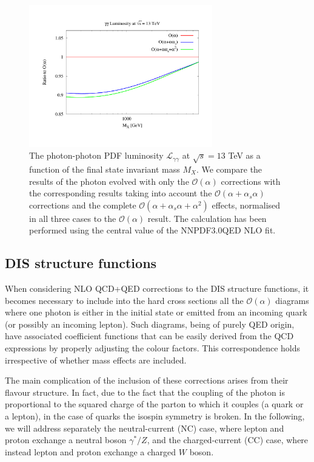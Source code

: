 \begin{figure}[t]
\includegraphics[width=8cm]{figs/lumi_13tev.pdf} 
\caption{The photon-photon PDF luminosity $\mathcal{L}_{\gamma\gamma}$ at $\sqrt{s} = 13$ TeV as a
  function of the final state invariant mass $M_X$.
  We compare the results of the photon evolved
  with only the $\mathcal{O}(\alpha)$ corrections
  with the corresponding results taking into account the 
  $\mathcal{O}(\alpha+\alpha_s\alpha)$ corrections
  and the complete
  $\mathcal{O}(\alpha+\alpha_s\alpha+\alpha^2)$ effects,
  normalised in all three cases to the $\mathcal{O}(\alpha)$ result.
  The calculation has been performed using the central value of the NNPDF3.0QED NLO
  fit.  }
\label{fig:GammaGammaLumi}
\end{figure}

\subsection{DIS structure functions}

When considering NLO QCD+QED corrections to the DIS structure
functions, it becomes necessary to include into the hard cross
sections all the $\mathcal{O}(\alpha)$ diagrams where one photon is
either in the initial state or emitted from an incoming quark (or
possibly an incoming lepton).
%
Such diagrams, being of purely QED origin, have associated coefficient
functions that can be easily derived from the QCD expressions by
properly adjusting the colour factors.
%
This correspondence holds irrespective of whether mass effects are
included.

The main complication of the inclusion of these corrections arises
from their flavour structure. In fact, due to the fact that the
coupling of the photon is proportional to the squared charge of the
parton to which it couples (a quark or a lepton), in the case of
quarks the isospin symmetry is broken.
%
In the following, we will address separately the neutral-current (NC)
case, where lepton and proton exchange a neutral boson $\gamma^*/Z$,
and the charged-current (CC) case, where instead lepton and proton
exchange a charged $W$ boson.

